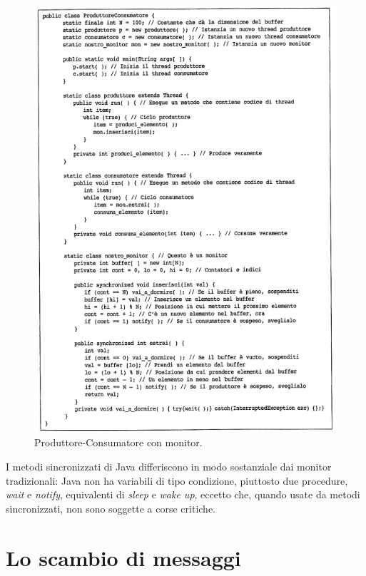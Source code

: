 \begin{figure}[H]
    \centering
    \includegraphics[width=1\linewidth]{assets/producerconsumermonitor6.png}
    \caption{Produttore-Consumatore con monitor.}
    \label{producerconsumermonitor}
\end{figure}

I metodi sincronizzati di Java differiscono in modo sostanziale dai monitor tradizionali: Java non ha variabili di tipo condizione, piuttosto due procedure, \textit{wait} e \textit{notify}, equivalenti di \textit{sleep} e \textit{wake up}, eccetto che, quando usate da metodi sincronizzati, non sono soggette a corse critiche.








\section{Lo scambio di messaggi}

